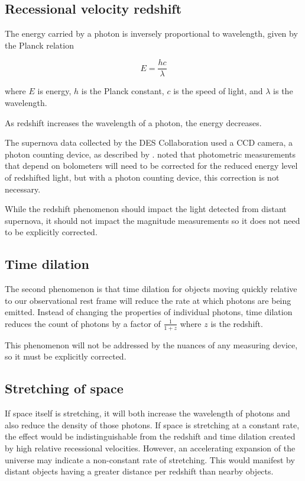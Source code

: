\documentclass{article}
\begin{document}
\subsection{Recessional velocity redshift}

The energy carried by a photon is inversely proportional to wavelength, given
by the Planck relation

\begin{equation}
  E = \frac{hc}{\lambda}
\end{equation}

where $E$ is energy, $h$ is the Planck constant, $c$ is the speed of light, and
$\lambda$ is the wavelength.

As redshift increases the wavelength of a photon, the energy decreases.

The supernova data collected by the DES Collaboration used a CCD camera, a
photon counting device, as described by \citet{flaugher2015}.  \citet{kim1996}
noted that photometric measurements that depend on bolometers will need to be
corrected for the reduced energy level of redshifted light, but with a photon
counting device, this correction is not necessary.

While the redshift phenomenon should impact the light detected from distant
supernova, it should not impact the magnitude measurements so it does not need
to be explicitly corrected.

\subsection{Time dilation}

The second phenomenon is that time dilation for objects moving quickly relative
to our observational rest frame will reduce the rate at which photons are being
emitted. Instead of changing the properties of individual photons, time
dilation reduces the count of photons by a factor of $\frac{1}{1+z}$ where $z$
is the redshift.

This phenomenon will not be addressed by the nuances of any measuring device,
so it must be explicitly corrected.

\subsection{Stretching of space}

If space itself is stretching, it will both increase the wavelength of photons
and also reduce the density of those photons. If space is stretching at a
constant rate, the effect would be indistinguishable from the redshift and time
dilation created by high relative recessional velocities. However, an
accelerating expansion of the universe may indicate a non-constant rate of
stretching. This would manifest by distant objects having a greater distance
per redshift than nearby objects.
\end{document}
